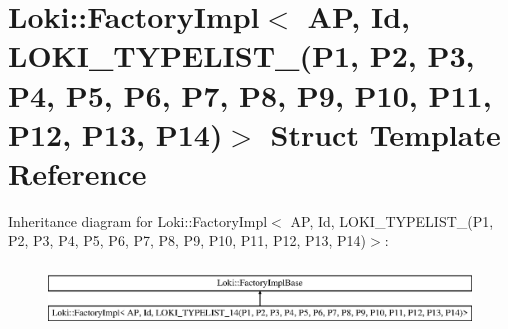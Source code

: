 \hypertarget{structLoki_1_1FactoryImpl_3_01AP_00_01Id_00_01LOKI__TYPELIST__14_07P1_00_01P2_00_01P3_00_01P4_00ffe9f7654c2917213926c996b21bf7a6}{}\section{Loki\+:\+:Factory\+Impl$<$ A\+P, Id, L\+O\+K\+I\+\_\+\+T\+Y\+P\+E\+L\+I\+S\+T\+\_(P1, P2, P3, P4, P5, P6, P7, P8, P9, P10, P11, P12, P13, P14)$>$ Struct Template Reference}
\label{structLoki_1_1FactoryImpl_3_01AP_00_01Id_00_01LOKI__TYPELIST__14_07P1_00_01P2_00_01P3_00_01P4_00ffe9f7654c2917213926c996b21bf7a6}
Inheritance diagram for Loki\+:\+:Factory\+Impl$<$ A\+P, Id, L\+O\+K\+I\+\_\+\+T\+Y\+P\+E\+L\+I\+S\+T\+\_(P1, P2, P3, P4, P5, P6, P7, P8, P9, P10, P11, P12, P13, P14)$>$\+:\begin{figure}[H]
\begin{center}
\leavevmode
\includegraphics[height=1.691843cm]{structLoki_1_1FactoryImpl_3_01AP_00_01Id_00_01LOKI__TYPELIST__14_07P1_00_01P2_00_01P3_00_01P4_00ffe9f7654c2917213926c996b21bf7a6}
\end{center}
\end{figure}
